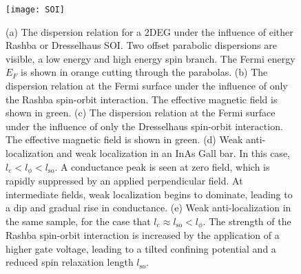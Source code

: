 \begin{figure}
  \texttt{[image: SOI]}
  \caption[The spin-orbit interaction and weak anti-localization]
  {\label{fig:SOI}(a) The dispersion relation for a 2DEG under the influence of either Rashba or Dresselhaus SOI. Two offset parabolic dispersions are visible,
  a low energy and high energy spin branch. The Fermi energy $E_F$ is shown in orange cutting through the parabolas.
  (b) The dispersion relation at the Fermi surface under the influence of only the Rashba spin-orbit interaction. The effective magnetic field is shown in green. (c) The dispersion relation at the Fermi surface under the influence of only the Dresselhaus spin-orbit interaction.
  The effective magnetic field is shown in green. (d) Weak anti-localization and weak localization in an InAs Gall bar. In this case, $l_e < l_\phi < l_\textrm{so}$. A
  conductance peak is seen at zero field, which is rapidly suppressed by an applied perpendicular field. At intermediate fields, weak localization begins to dominate, leading to a dip and gradual rise in conductance. (e) Weak anti-localization in the same sample, for the case that $l_e \approx l_\textrm{so} < l_\phi$.
  The strength of the Rashba spin-orbit interaction is increased by the application of a higher gate voltage, leading to a tilted confining potential and
  a reduced spin relaxation length $l_\textrm{so}$.}
\end{figure}

